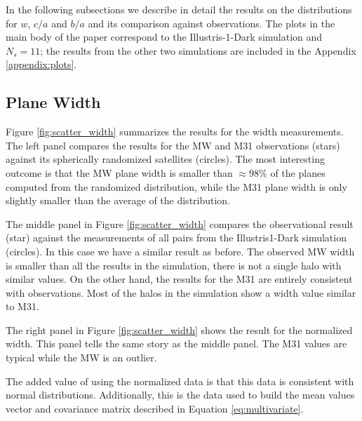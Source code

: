 \documentclass[a4paper,fleqn,usenatbib]{mnras}
\begin{document}
In the following subsections we describe in detail the results on the 
distributions for $w$, $c/a$ and $b/a$ and its comparison against
observations. 
The plots in the main body of the paper correspond to the
Illustris-1-Dark simulation and $N_s=11$; the results from the other
two simulations are included in the Appendix \ref{appendix:plots}.

\subsection{Plane Width}

Figure \ref{fig:scatter_width} summarizes the results for the width
measurements.
The left panel compares the results for the MW and M31
observations (stars) against its spherically randomized satellites
(circles). 
The most interesting outcome is that the MW plane width is smaller
than $\approx 98\%$ of the planes computed from the randomized distribution,
while the M31 plane width is only slightly smaller than the average of
the distribution.

The middle panel in Figure \ref{fig:scatter_width} compares the
observational result (star) against the measurements of all pairs from the Illustris1-Dark
simulation (circles).
In this case we have a similar result as before. 
The observed MW width is smaller than all the results in the
simulation, there is not a single halo with similar values.
On the other hand, the results for the M31 are entirely consistent
with observations. Most of the halos in the simulation show a width
value similar to M31. 

The right panel in Figure \ref{fig:scatter_width} shows the result for
the normalized width.  
This panel tells the same story as the middle panel. 
The M31 values are typical while the MW is an outlier. 

The added value of using the normalized data is that this data is 
consistent with normal distributions.
Additionally, this is the data used to build the mean values vector and covariance
matrix described in Equation \ref{eq:multivariate}. 
\end{document}
